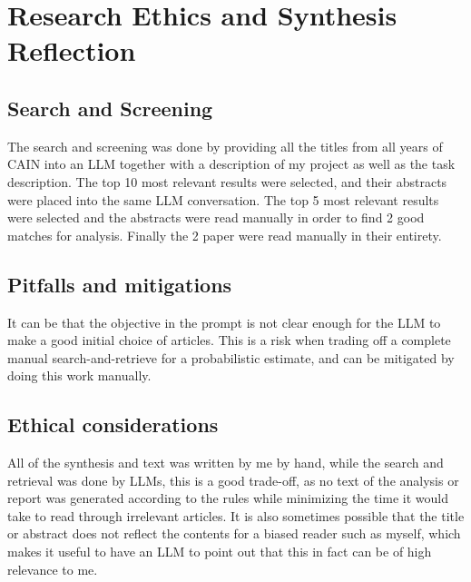 \documentclass[a4paper, 11pt]{article} %
\begin{document}
\section{Research Ethics and Synthesis Reflection}
\subsection{Search and Screening}
The search and screening was done by providing all the titles from all years of CAIN into an LLM together with a description of my project as well as the task description.
The top 10 most relevant results were selected, and their abstracts were placed into the same LLM conversation.
The top 5 most relevant results were selected and the abstracts were read manually in order to find 2 good matches for analysis.
Finally the 2 paper were read manually in their entirety.

\subsection{Pitfalls and mitigations}
It can be that the objective in the prompt is not clear enough for the LLM to make a good initial choice of articles. This is a risk when trading off a complete manual search-and-retrieve
for a probabilistic estimate, and can be mitigated by doing this work manually.

\subsection{Ethical considerations}
All of the synthesis and text was written by me by hand, while the search and retrieval was done by LLMs, this is a good trade-off, as no text of the analysis or report was generated according to the rules
while minimizing the time it would take to read through irrelevant articles. It is also sometimes possible that the title or abstract does not reflect the contents for a biased 
reader such as myself, which makes it useful to have an LLM to point out that this in fact can be of high relevance to me.

\newpage


\end{document}
